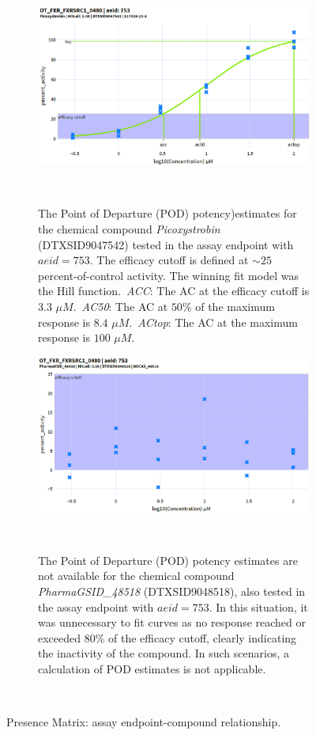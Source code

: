 \begin{figure}[h]
    \centering
    \begin{subfigure}[b]{0.48\textwidth}
        \centering
        \includegraphics[width=\textwidth]{figures/POD.png}
        \caption{The Point of Departure (POD) potency)estimates for the chemical compound \emph{Picoxystrobin} (DTXSID9047542) tested in the assay endpoint with $aeid=753$. The efficacy cutoff is defined at $\sim25$ percent-of-control activity. The winning fit model was the Hill function.~\emph{ACC}: The AC at the efficacy cutoff is $3.3$ $\mu M$.~\emph{AC50}: The AC at $50\%$ of the maximum response is $8.4$ $\mu M$.~\emph{ACtop}: The AC at the maximum response is $100$ $\mu M$.}
    ~\label{fig:active_and_pod}
    \end{subfigure}
    \hfill
    \begin{subfigure}[b]{0.48\textwidth}
        \centering
        \includegraphics[width=\textwidth]{figures/inactive_and_no_pod.png}
        \caption{The Point of Departure (POD) potency estimates are not available for the chemical compound \emph{PharmaGSID\_48518} (DTXSID9048518), also tested in the assay endpoint with $aeid=753$. In this situation, it was unnecessary to fit curves as no response reached or exceeded $80\%$ of the efficacy cutoff, clearly indicating the inactivity of the compound. In such scenarios, a calculation of POD estimates is not applicable.}
        ~\label{fig:inactive_and_no_pod}
    \end{subfigure}
    \caption{Presence Matrix: assay endpoint-compound relationship.}
    ~\label{fig:pod}
\end{figure}



